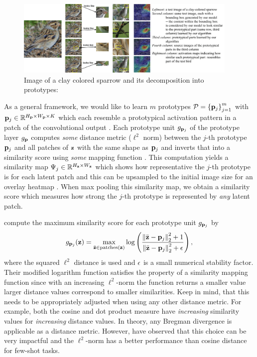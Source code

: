 \begin{figure}[h]
    \centering
    \includegraphics[width=0.95\textwidth]{Figures/Chapter3/introbird-1.png}
    \caption[Image of a clay colored sparrow and its decomposition into prototypes]{Image of a clay colored sparrow and its decomposition into prototypes: \citep{ChenLTBRS19}}
    \label{fig:looke_like}
\end{figure}
As a general framework, we would like to learn $m$ prototypes $\mathcal{P}=\left\{\mathbf{p}_{j}\right\}_{j=1}^{m}$ with $\mathbf{p}_{j} \in \mathbb{R}^{H_{\mathbf{p}} \times W_{\mathbf{p}} \times K}$ which each resemble a prototypical activation pattern in a patch of the convolutional output \citep{ChenLTBRS19}. Each prototype unit $g_{\mathbf{p}_{j}}$ of the prototype layer $g_{\mathbf{p}}$ computes \emph{some} distance metric (\eg $\ell^2$ norm) between the $j$-th prototype $\mathbf{p}_{j}$ and all patches of $\mathbf{z}$ with the same shape as $\mathbf{p}_{j}$ and inverts that into a similarity score using \emph{some} mapping function \citep{ChenLTBRS19}. This computation yields a similarity map $\Psi_j \in \mathbb{R}^{H_{\mathbf{z}} \times W_{\mathbf{z}}}$ which shows how representative the $j$-th prototype is for each latent patch and this can be upsampled to the initial image size for an overlay heatmap \citep{ChenLTBRS19}. When max pooling this similarity map, we obtain a similarity score which measures how strong the $j$-th prototype is represented by \emph{any} latent patch. 

\citet{ChenLTBRS19} compute the maximum similarity score for each prototype unit $g_{\mathbf{p}_{j}}$ by
\begin{equation}
\label{eq:prot_layer_function}
    g_{\mathbf{p}_{j}}(\mathbf{z}) = \max_{\Bar{\mathbf{z}} \in \text{patches}(\mathbf{z})} \log \left( \frac{\left\|\Bar{\mathbf{z}} - \mathbf{p}_{j}\right\|^2_2 + 1}{\left\|\Bar{\mathbf{z}} - \mathbf{p}_{j}\right\|^2_2 + \epsilon} \right),
\end{equation}
where the squared $\ell^2$ distance is used and $\epsilon$ is a small numerical stability factor. Their modified logarithm function satisfies the property of a similarity mapping function since with an increasing $\ell^2$-norm the function returns a smaller value \ie larger distance values correspond to smaller similarities. Keep in mind, that this needs to be appropriately adjusted when using any other distance metric. For example, both the cosine and dot product measure have \emph{increasing} similarity values for \emph{increasing} distance values. In theory, any Bregman divergence \citep{BanerjeeMDG04} is applicable as a distance metric. However, \citet{SnellSZ17} have observed that this choice can be very impactful and the $\ell^2$-norm has a better performance than cosine distance for few-shot tasks. 

